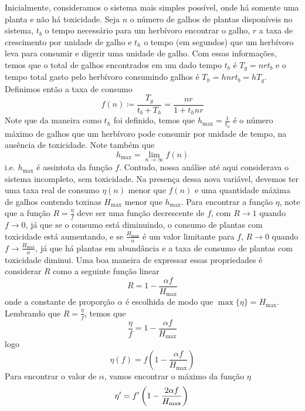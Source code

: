 \documentclass{article}
\begin{document}
Inicialmente, consideramos o sistema mais simples possível, onde há somente uma planta e não há toxicidade. Seja $n$ o número de galhos de plantas disponíveis no sistema, $t_b$ o tempo necessário para um herbívoro encontrar o galho, $r$ a taxa de crescimento por unidade de galho e $t_h$ o tempo (em segundos) que um herbívoro leva para consumir e digerir uma unidade de galho. Com essas informações, temos que o total de galhos encontrados em um dado tempo $t_b$ é $T_g = n r t_b$ e o tempo total gasto pelo herbívoro consumindo galhos é $T_h = h n r t_b = h T_g$. Definimos então a taxa de consumo
\begin{equation}
    f(n) \coloneqq \frac{T_g}{t_b + T_h} = \frac{n r}{1 + t_h n r}
\end{equation}
Note que da maneira como $t_h$ foi definido, temos que $h_{\max} = \frac{1}{t_h}$ é o número máximo de galhos que um herbívoro pode consumir por unidade de tempo, na ausência de toxicidade. Note também que
\begin{equation}
    h_{\max} = \lim_{n \to \infty} f(n)
\end{equation}
i.e. $h_{\max}$ é assintota da função $f$. Contudo, nossa análise até aqui considerava o sistema incompleto, sem toxicidade. Na presença dessa nova variável, devemos ter uma taxa real de consumo $\eta(n)$ menor que $f(n)$ e uma quantidade máxima de galhos contendo toxinas $H_{\max}$ menor que $h_{\max}$. Para encontrar a função $\eta$, note que a função $R = \frac{\eta}{f}$ deve ser uma função decrescente de $f$, com $R \to 1$ quando $f \to 0$, já que se o consumo está diminuindo, o consumo de plantas com toxicidade está aumentando, e se $\frac{H_{\max}}{\alpha}$ é um valor limitante para $f$, $R \to 0$ quando $f \to \frac{H_{\max}}{\alpha}$, já que há plantas em abundância e a taxa de consumo de plantas com toxicidade diminui. Uma boa maneira de expressar essas propriedades é considerar $R$ como a seguinte função linear \[ R = 1 - \frac{\alpha f}{H_{\max}} \] onde a constante de proporção $\alpha$ é escolhida de modo que $\max\{\eta\} = H_{\max}$. Lembrando que $R = \frac{\eta}{f}$, temos que
\begin{equation*}
    \frac{\eta}{f} = 1 - \frac{\alpha f}{H_{\max}}
\end{equation*}
logo
\begin{equation}
    \eta(f) = f\left(1 - \frac{\alpha f}{H_{\max}}\right)
\end{equation}
Para encontrar o valor de $\alpha$, vamos encontrar o máximo da função $\eta$
\begin{equation*}
    \eta' = f'\left(1 - \frac{2 \alpha f}{H_{\max}}\right) \\
\end{equation*}
\end{document}
